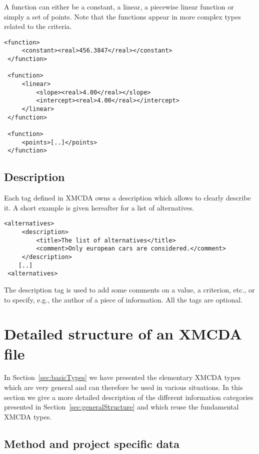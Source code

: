 \documentclass[a4paper,oneside,10 pt]{article}
\newcommand{\XMCDA}{{\asciifamily XMCDA}\xspace}
\newcommand{\code}{\asciifamily}
\begin{document}
A {\code function} can either be a constant, a linear, a piecewise linear function or simply a set of points. Note that the functions appear in more complex types related to the criteria. 

{\code
\begin{lstlisting}[style=prototype]
 <function>
	 <constant><real>456.3847</real></constant>
 </function>

 <function>
	 <linear>
		 <slope><real>4.00</real></slope>
		 <intercept><real>4.00</real></intercept>
	 </linear>
 </function>

 <function>
	 <points>[..]</points>
 </function>
\end{lstlisting}
}

\subsection{Description}

Each tag defined in {\code XMCDA} owns a description which allows to clearly describe it. A short example is given hereafter for a list of alternatives. 
{\code
\begin{lstlisting}[style=prototype]
 <alternatives>
	 <description>
		 <title>The list of alternatives</title>
		 <comment>Only european cars are considered.</comment>
	 </description>
	[..]
 <alternatives>
\end{lstlisting}
}
The description tag is used to add some comments on a value, a criterion, etc., or to specify, e.g., the author of a piece of information. All the tags are optional. 




\section{Detailed structure of an \XMCDA file}\label{sec:additionalTypes}

In Section~\ref{sec:basicTypes} we have presented the elementary \XMCDA types which are very general and can therefore be used in various situations. 
In this section we give a more detailed description of the different information categories presented in Section~\ref{sec:generalStructure} and which reuse the fundamental \XMCDA types.

\subsection{Method and project specific data}
\end{document}
